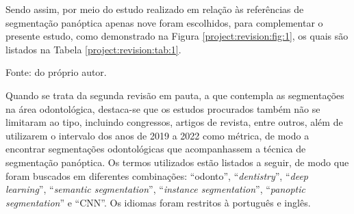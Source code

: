 Sendo assim, por meio do estudo realizado em relação às referências de segmentação panóptica apenas nove foram escolhidos, para complementar o presente estudo, como demonstrado na Figura \ref{project:revision:fig:1}, os quais são listados na Tabela \ref{project:revision:tab:1}.

\begin{table}[H]
    \centering
    \caption{Trabalhos selecionados a partir da revisão sobre segmentação panóptica.}
    \label{project:revision:tab:1}

    \vspace*{1 cm}
    Fonte: do próprio autor.
\end{table}

Quando se trata da segunda revisão em pauta, a que contempla as segmentações na área odontológica, destaca-se que os estudos procurados também não se limitaram ao tipo, incluindo congressos, artigos de revista, entre outros, além de utilizarem o intervalo dos anos de 2019 a 2022 como métrica, de modo a encontrar segmentações odontológicas que acompanhassem a técnica de segmentação panóptica. Os termos utilizados estão listados a seguir, de modo que foram buscados em diferentes combinações: ``odonto'', ``\textit{dentistry}'', ``\textit{deep learning}'', ``\textit{semantic segmentation}'', ``\textit{instance segmentation}'', ``\textit{panoptic segmentation}'' e ``CNN''. Os idiomas foram restritos à português e inglês.

